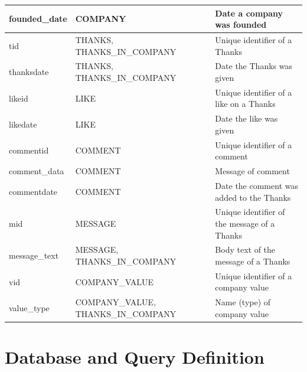 \documentclass[11pt]{report}
\begin{document}
\begin{table}[h]
{\begin{tabular}{|l|l|l|}
founded\_date                            & COMPANY                                      & Date a company was founded                       \\ \hline
tid                                      & THANKS, THANKS\_IN\_COMPANY                  & Unique identifier of a Thanks                    \\ \hline
thanksdate                               & THANKS, THANKS\_IN\_COMPANY                  & Date the Thanks was given                        \\ \hline
likeid                                   & LIKE                                         & Unique identifier of a like on a Thanks          \\ \hline
likedate                                 & LIKE                                         & Date the like was given                          \\ \hline
commentid                                & COMMENT                                      & Unique identifier of a comment                   \\ \hline
comment\_data                            & COMMENT                                      & Message of comment                    \\ \hline
commentdate                              & COMMENT                                      & Date the comment was added to the Thanks         \\ \hline
mid                                      & MESSAGE                                      & Unique identifier of the message of a Thanks     \\ \hline
message\_text                            & MESSAGE, THANKS\_IN\_COMPANY                 & Body text of the message of a Thanks             \\ \hline
vid                                      & COMPANY\_VALUE                               & Unique identifier of a company value             \\ \hline
value\_type                              & COMPANY\_VALUE, THANKS\_IN\_COMPANY          & Name (type) of company value                     \\ \hline
\end{tabular}
}
\end{table}
\clearpage

\chapter{Database and Query Definition}
\end{document}
